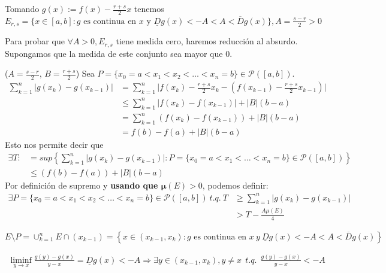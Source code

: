 \documentclass[11pt, a4paper]{article}
\makeatletter
\newif\IfInSansMode
\let\oldsf\sffamily
\renewcommand*{\sffamily}{\oldsf\mathversion{sans}\InSansModetrue}
\let\oldnorm\normalfont
\renewcommand*{\normalfont}{\oldnorm\InSansModefalse\mathversion{normal}}
\renewenvironment{proof}[1][\proofname] {\par\pushQED{\qed}\normalfont\topsep6\p@\@plus6\p@\relax\trivlist\item[\hskip\labelsep\itshape\sffamily#1\@addpunct{.}]\ignorespaces}{\popQED\endtrivlist\@endpefalse}
\theoremstyle{theorem-style}
\theoremstyle{definition-style}
\theoremstyle{remark-style}
\theoremstyle{example-style}
\makeatother
\begin{document}
\begin{proof}
    Tomando $g(x) := f(x) - \frac{r+s}{2}x$ tenemos $E_{r,s} = \{ x \in [a, b] : g \text{ es continua en } x \text{ y } \underline{D} g(x) < - A < A < \overline{D} g(x) \}, A = \frac{s-r}{2} > 0$

    Para probar que $\forall A > 0, E_{r,s}$ tiene medida cero, haremos reducción al absurdo. Supongamos que la medida de este conjunto sea mayor que 0.

    ($A = \frac{s-r}{2}$, $B = \frac{r+s}{2}$)
    Sea $P = \{ x_0 = a < x_1 < x_2 < \hdots < x_n = b \} \in \mathcal P([a,b])$.
    \begin{align*}
        \label{}
        \sum^{n}_{k=1} |g(x_k) - g(x_{k-1})| &= \sum^{n}_{k=1} \bigg\lvert  f(x_k) - \frac{r+s}{2}x_k - \left( f(x_{k-1}) - \frac{r+s}{2} x_{k-1} \right) \bigg\rvert \\
                                             &\leq \sum^{n}_{k=1} |f(x_k) - f(x_{k-1}) | + |B| (b-a)  \\
                                             &= \sum^{n}_{k=1}  (f(x_k) - f(x_{k-1})) + |B|(b-a) \\
                                             &= f(b) - f(a) + |B|(b-a)  
    \end{align*}
Esto nos permite decir que \begin{align*}
    \exists T :&= sup \left\{ \sum^{n}_{k=1} |g(x_k) - g(x_{k-1})| : P = \{ x_0 = a < x_1 < \hdots < x_n = b \} \in \mathcal P ([a, b]) \right\} \\
    & \leq (f(b) - f(a)) + |B|(b-a)
\end{align*}
Por definición de supremo y \textbf{usando que $\mathbf \mu(E) > 0$}, podemos definir: \begin{align*}
    \label{}
    \exists P = \{ x_0 = a < x_1 < x_2 < \hdots < x_n = b \} \in \mathcal P([a,b]) \ t.q. \ T &\geq \sum^{n}_{k=1} |g(x_k) - g(x_{k-1})| \\
                                                                                     & > T - \frac{A \mu(E)}{4}
\end{align*}

$E \setminus P = \cup_{k=1}^n E \cap (x_{k-1}) = \left\{ x \in (x_{k-1}, x_k) : g \text{ es continua en } x \ y \ \underline{D}g(x) < -A < A < \overline{D}g(x) \right\}$

\begin{align*}
    \label{}
    \liminf_{y \to x} \frac{g(y) - g(x)}{y - x} = \underline{D}g(x) < -A \Rightarrow \exists y \in (x_{k-1}, x_k), y \neq x \ \ t.q. \ \ \frac{g(y) - g(x)}{y-x} < -A
\end{align*}


\end{proof}
\end{document}
